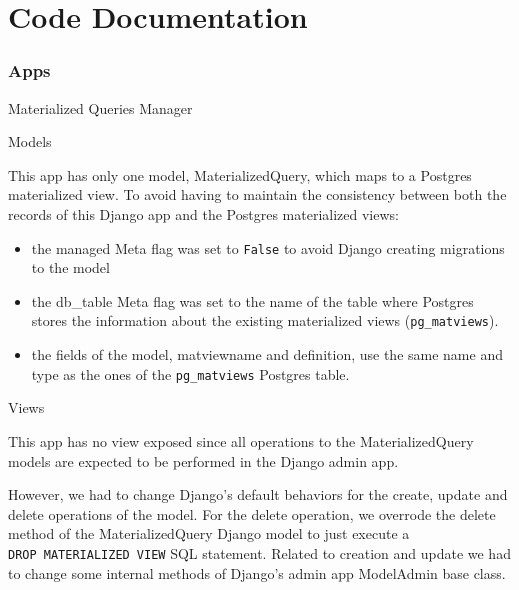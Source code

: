 \documentclass[
]{book}
\providecommand{\tightlist}{%
  \setlength{\itemsep}{0pt}\setlength{\parskip}{0pt}}
\begin{document}
\hypertarget{code-documentation}{%
\chapter{Code Documentation}\label{code-documentation}}

\hypertarget{apps}{%
\subsection*{Apps}\label{apps}}

Materialized Queries Manager

Models

This app has only one model, MaterializedQuery, which maps to a Postgres materialized view.
To avoid having to maintain the consistency between both the records of this Django app and the Postgres materialized views:

\begin{itemize}
\tightlist
\item
  the managed Meta flag was set to \texttt{False} to avoid Django creating migrations to the model
\item
  the db\_table Meta flag was set to the name of the table where Postgres stores the information about the existing materialized views (\texttt{pg\_matviews}).
\item
  the fields of the model, matviewname and definition, use the same name and type as the ones of the \texttt{pg\_matviews} Postgres table.
\end{itemize}

Views

This app has no view exposed since all operations to the MaterializedQuery models are expected to be performed in the Django admin app.

However, we had to change Django's default behaviors for the create, update and delete operations of the model.
For the delete operation, we overrode the delete method of the MaterializedQuery Django model to just execute a \texttt{DROP\ MATERIALIZED\ VIEW} SQL statement.
Related to creation and update we had to change some internal methods of Django's admin app ModelAdmin base class.
\end{document}

